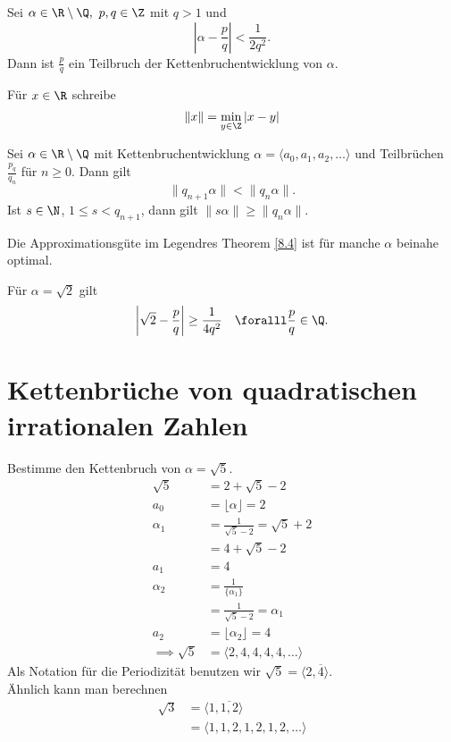 \begin{thm}[Legendre]\autolabel
	Sei $\alpha \in \R \setminus \Q,\ p,q \in \Z$ mit $q > 1$ und
	\[ \left| \alpha - \frac{p}{q} \right| < \frac{1}{2q^2}. \]
	Dann ist $\frac{p}{q}$ ein Teilbruch der Kettenbruchentwicklung von $\alpha$.
\end{thm}

\begin{defn*}
	Für $x \in \R$ schreibe
	\[ \|x\| = \min_{y \in \Z} |x-y| \]
\end{defn*}

\begin{thm}\autolabel
	Sei $\alpha \in \R \setminus \Q$ mit Kettenbruchentwicklung $\alpha = \langle a_0,a_1,a_2,\dots \rangle$ und Teilbrüchen $\frac{p_q}{q_n}$ für $n \geq 0$. Dann gilt
	\[ \|q_{n+1} \alpha \| < \| q_n\alpha \|. \]
	Ist $s \in \N$, $1 \leq s < q_{n+1}$, dann gilt \( \|s\alpha\| \geq \|q_n\alpha\|. \)
\end{thm}

\begin{rem*}
	Die Approximationsgüte im Legendres Theorem \ref{8.4} ist für manche $\alpha$ beinahe optimal.
\end{rem*}

\begin{exmp*}
	Für $\alpha = \sqrt{2}$ gilt
	\[ \left| \sqrt{2} - \frac{p}{q} \right| \geq \frac{1}{4q^2} \quad \foralll \frac{p}{q} \in \Q. \]
\end{exmp*}

\section{Kettenbrüche von quadratischen irrationalen Zahlen}

\begin{exmp*}
	Bestimme den Kettenbruch von $\alpha = \sqrt{5}$.
	\begin{align*}
		\sqrt{5} &= 2 + \sqrt{5} - 2\\
		a_0 &= \lfloor \alpha \rfloor = 2\\
		\alpha_1 &= \frac{1}{\sqrt{5}-2} = \sqrt{5} + 2\\
		&= 4 + \sqrt{5} - 2\\
		a_1 &= 4\\
		\alpha_2 &= \frac{1}{\{ \alpha_1 \}}\\
		&=\frac{1}{\sqrt{5}-2} = \alpha_1\\
		a_2 &= \lfloor \alpha_2\rfloor = 4\\
		\implies \sqrt{5} &= \langle 2,4,4,4,4,\dots \rangle
	\end{align*}
	Als Notation für die Periodizität benutzen wir $\sqrt{5} = \langle 2,\overbar{4}\rangle$.\\
	Ähnlich kann man berechnen
	\begin{align*}
		\sqrt{3} &= \langle 1,\overbar{1,2}\rangle\\
		&= \langle 1,1,2,1,2,1,2,\dots\rangle
	\end{align*}
\end{exmp*}

